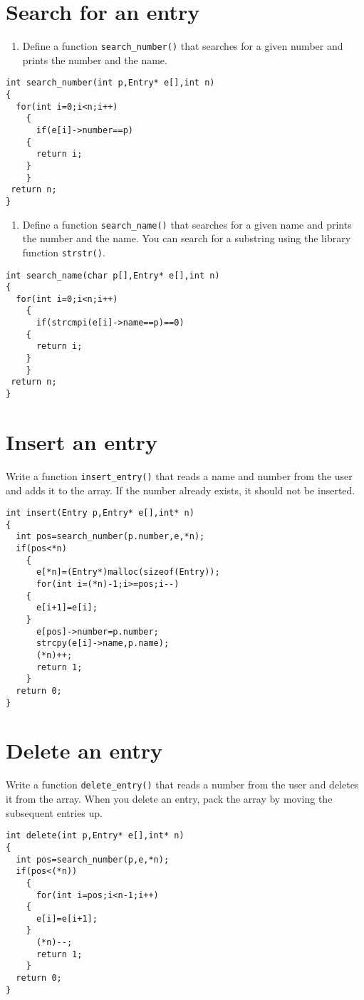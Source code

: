\documentclass[11pt]{article}
\begin{document}
\section{Search for an entry}
\label{sec-2}
\begin{enumerate}
\item Define a function \texttt{search\_number()} that searches for a given
number and prints the number and the name.
\end{enumerate}
\begin{verbatim}
int search_number(int p,Entry* e[],int n)
{
  for(int i=0;i<n;i++)
    {
      if(e[i]->number==p)
	{
	  return i;
	}
    }
 return n;
}
\end{verbatim}
\begin{enumerate}
\item Define a function \texttt{search\_name()} that searches for a given
name and prints the number and the name. You can search
for a substring using the library function \texttt{strstr()}.
\end{enumerate}
\begin{verbatim}
int search_name(char p[],Entry* e[],int n)
{
  for(int i=0;i<n;i++)
    {
      if(strcmpi(e[i]->name==p)==0)
	{
	  return i;
	}
    }
 return n;
}
\end{verbatim}

\section{Insert an entry}
\label{sec-3}
Write a function \texttt{insert\_entry()} that reads a name and number
from the user and adds it to the array. If the number
already exists, it should not be inserted.
\begin{verbatim}
int insert(Entry p,Entry* e[],int* n)
{
  int pos=search_number(p.number,e,*n);
  if(pos<*n)
    {
      e[*n]=(Entry*)malloc(sizeof(Entry));
      for(int i=(*n)-1;i>=pos;i--)
	{
	  e[i+1]=e[i];
	}
      e[pos]->number=p.number;
      strcpy(e[i]->name,p.name);
      (*n)++;
      return 1;
    }
  return 0;
}
\end{verbatim}

\section{Delete an entry}
\label{sec-4}
Write a function \texttt{delete\_entry()} that reads a number from
the user and deletes it from the array. When you delete an
entry, pack the array by moving the subsequent entries up.
\begin{verbatim}
int delete(int p,Entry* e[],int* n)
{
  int pos=search_number(p,e,*n);
  if(pos<(*n))
    {
      for(int i=pos;i<n-1;i++)
	{
	  e[i]=e[i+1];
	}
      (*n)--;
      return 1;
    }
  return 0;
}
\end{verbatim}
\end{document}
